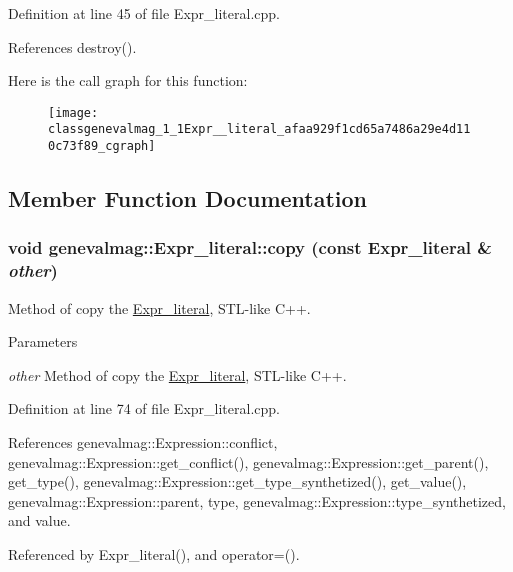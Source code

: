 Definition at line 45 of file Expr\_\-literal.cpp.



References destroy().



Here is the call graph for this function:\nopagebreak
\begin{figure}[H]
\begin{center}
\leavevmode
\texttt{[image: classgenevalmag\_1\_1Expr\_\_literal\_afaa929f1cd65a7486a29e4d110c73f89\_cgraph]}
\end{center}
\end{figure}




\subsection{Member Function Documentation}
\hypertarget{classgenevalmag_1_1Expr__literal_aab439489dbf96ebac5c518277a681698}{
\subsubsection[{copy}]{\setlength{\rightskip}{0pt plus 5cm}void genevalmag::Expr\_\-literal::copy (const {\bf Expr\_\-literal} \& {\em other})}}
\label{classgenevalmag_1_1Expr__literal_aab439489dbf96ebac5c518277a681698}
Method of copy the \hyperlink{classgenevalmag_1_1Expr__literal}{Expr\_\-literal}, STL-\/like C++. 
\begin{DoxyParams}{Parameters}
\item[{\em other}]Method of copy the \hyperlink{classgenevalmag_1_1Expr__literal}{Expr\_\-literal}, STL-\/like C++. \end{DoxyParams}


Definition at line 74 of file Expr\_\-literal.cpp.



References genevalmag::Expression::conflict, genevalmag::Expression::get\_\-conflict(), genevalmag::Expression::get\_\-parent(), get\_\-type(), genevalmag::Expression::get\_\-type\_\-synthetized(), get\_\-value(), genevalmag::Expression::parent, type, genevalmag::Expression::type\_\-synthetized, and value.



Referenced by Expr\_\-literal(), and operator=().



